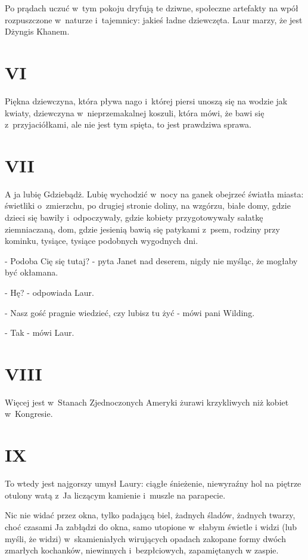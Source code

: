 \documentclass[oneside,polish,12pt,sfheadings]{mwbk}
\begin{document}
Po prądach uczuć w~tym pokoju dryfują te dziwne, społeczne artefakty
na wpół rozpuszczone w~naturze i~tajemnicy: jakieś ładne dziewczęta.
Laur marzy, że jest Dżyngis Khanem.

\chapter{VI}

Piękna dziewczyna, która pływa nago i~której piersi unoszą się na
wodzie jak kwiaty, dziewczyna w~nieprzemakalnej koszuli, która mówi,
że bawi się z~przyjaciółkami, ale nie jest tym spięta, to jest prawdziwa
sprawa.

\chapter{VII}

A ja lubię Gdziebądż. Lubię wychodzić w~nocy na ganek obejrzeć światła
miasta: świetliki o~zmierzchu, po drugiej stronie doliny, na wzgórzu,
białe domy, gdzie dzieci się bawiły i~odpoczywały, gdzie kobiety przygotowywały
sałatkę ziemniaczaną, dom, gdzie jesienią bawią się patykami z~psem,
rodziny przy kominku, tysiące, tysiące podobnych wygodnych dni.

- Podoba Cię się tutaj? - pyta Janet nad deserem, nigdy nie myśląc,
że mogłaby być okłamana.

- Hę? - odpowiada Laur.

- Nasz gość pragnie wiedzieć, czy lubisz tu żyć - mówi pani Wilding.

- Tak - mówi Laur.

\chapter{VIII}

Więcej jest w~Stanach Zjednoczonych Ameryki żurawi krzykliwych niż
kobiet w~Kongresie.

\chapter{IX}

To wtedy jest najgorszy umysł Laury: ciągłe śnieżenie, niewyraźny
hol na piętrze otulony watą z~Ja liczącym kamienie i~muszle na parapecie.

Nic nie widać przez okna, tylko padającą biel, żadnych śladów, żadnych
twarzy, choć czasami Ja zabłądzi do okna, samo utopione w~słabym świetle
i widzi (lub myśli, że widzi) w~skamieniałych wirujących opadach zakopane
formy dwóch zmarłych kochanków, niewinnych i~bezpłciowych, zapamiętanych
w zaspie.
\end{document}
